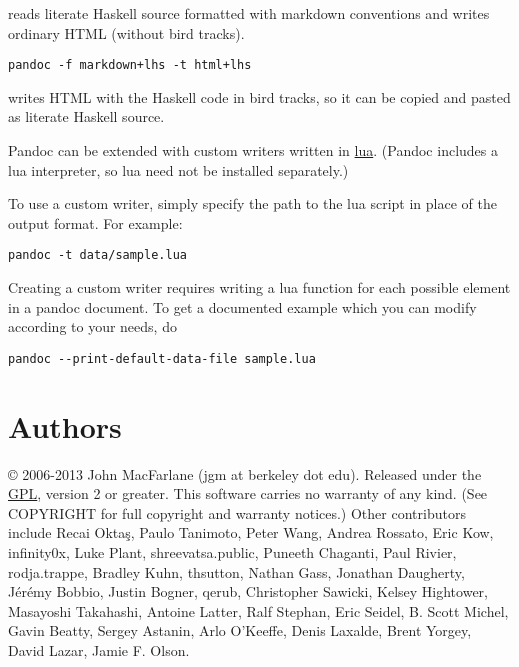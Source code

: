 \documentclass[]{article}
\begin{document}
reads literate Haskell source formatted with markdown conventions and
writes ordinary HTML (without bird tracks).

\begin{verbatim}
pandoc -f markdown+lhs -t html+lhs
\end{verbatim}

writes HTML with the Haskell code in bird tracks, so it can be copied
and pasted as literate Haskell source.


Pandoc can be extended with custom writers written in
\href{http://www.lua.org}{lua}. (Pandoc includes a lua interpreter, so
lua need not be installed separately.)

To use a custom writer, simply specify the path to the lua script in
place of the output format. For example:

\begin{verbatim}
pandoc -t data/sample.lua
\end{verbatim}

Creating a custom writer requires writing a lua function for each
possible element in a pandoc document. To get a documented example which
you can modify according to your needs, do

\begin{verbatim}
pandoc --print-default-data-file sample.lua
\end{verbatim}

\section{Authors}

© 2006-2013 John MacFarlane (jgm at berkeley dot edu). Released under
the \href{http://www.gnu.org/copyleft/gpl.html}{GPL}, version 2 or
greater. This software carries no warranty of any kind. (See COPYRIGHT
for full copyright and warranty notices.) Other contributors include
Recai Oktaş, Paulo Tanimoto, Peter Wang, Andrea Rossato, Eric Kow,
infinity0x, Luke Plant, shreevatsa.public, Puneeth Chaganti, Paul
Rivier, rodja.trappe, Bradley Kuhn, thsutton, Nathan Gass, Jonathan
Daugherty, Jérémy Bobbio, Justin Bogner, qerub, Christopher Sawicki,
Kelsey Hightower, Masayoshi Takahashi, Antoine Latter, Ralf Stephan,
Eric Seidel, B. Scott Michel, Gavin Beatty, Sergey Astanin, Arlo
O'Keeffe, Denis Laxalde, Brent Yorgey, David Lazar, Jamie F. Olson.
\end{document}
